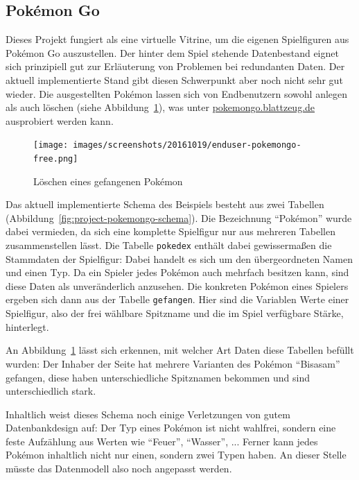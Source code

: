 \subsection{Pokémon Go}

Dieses Projekt fungiert als eine virtuelle Vitrine, um die eigenen Spielfiguren aus Pokémon Go auszustellen. Der hinter dem Spiel stehende Datenbestand eignet sich prinzipiell gut zur Erläuterung von Problemen bei redundanten Daten. Der aktuell implementierte Stand gibt diesen Schwerpunkt aber noch nicht sehr gut wieder. Die ausgestellten Pokémon lassen sich von Endbenutzern sowohl anlegen als auch löschen (siehe Abbildung~\ref{fig:enduser-pokemongo-delete}), was unter \href{http://pokemongo.blattzeug.de/}{\mbox{pokemongo.blattzeug.de}} ausprobiert werden kann.

\begin{figure}[h]
  \centering \texttt{[image: images/screenshots/20161019/enduser-pokemongo-free.png]}
  \caption{Löschen eines gefangenen Pokémon}
  \label{fig:enduser-pokemongo-delete}
\end{figure}

Das aktuell implementierte Schema des Beispiels besteht aus zwei Tabellen (Abbildung~\ref{fig:project-pokemongo-schema}). Die Bezeichnung "`Pokémon"' wurde dabei vermieden, da sich eine komplette Spielfigur nur aus mehreren Tabellen zusammenstellen lässt. Die Tabelle \texttt{pokedex} enthält dabei gewissermaßen die Stammdaten der Spielfigur: Dabei handelt es sich um den übergeordneten Namen und einen Typ. Da ein Spieler jedes Pokémon auch mehrfach besitzen kann, sind diese Daten als unveränderlich anzusehen. Die konkreten Pokémon eines Spielers ergeben sich dann aus der Tabelle \texttt{gefangen}. Hier sind die Variablen Werte einer Spielfigur, also der frei wählbare Spitzname und die im Spiel verfügbare Stärke, hinterlegt.

An Abbildung~\ref{fig:enduser-pokemongo-delete} lässt sich erkennen, mit welcher Art Daten diese Tabellen befüllt wurden: Der Inhaber der Seite hat mehrere Varianten des Pokémon "`Bisasam"' gefangen, diese haben unterschiedliche Spitznamen bekommen und sind unterschiedlich stark.

Inhaltlich weist dieses Schema noch einige Verletzungen von gutem Datenbankdesign auf: Der Typ eines Pokémon ist nicht wahlfrei, sondern eine feste Aufzählung aus Werten wie "`Feuer"', "`Wasser"', ... Ferner kann jedes Pokémon inhaltlich nicht nur einen, sondern zwei Typen haben. An dieser Stelle müsste das Datenmodell also noch angepasst werden.

